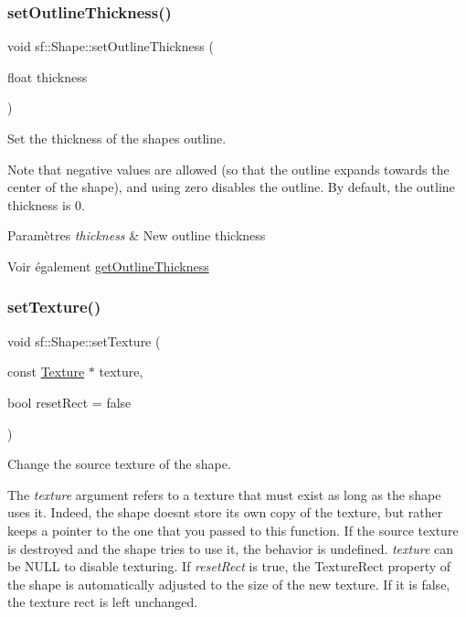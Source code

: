 \subsubsection{\texorpdfstring{set\+Outline\+Thickness()}{setOutlineThickness()}}
{\footnotesize\ttfamily void sf\+::\+Shape\+::set\+Outline\+Thickness (\begin{DoxyParamCaption}\item[{float}]{thickness }\end{DoxyParamCaption})}



Set the thickness of the shape\textquotesingle{}s outline. 

Note that negative values are allowed (so that the outline expands towards the center of the shape), and using zero disables the outline. By default, the outline thickness is 0.


\begin{DoxyParams}{Paramètres}
{\em thickness} & New outline thickness\\
\hline
\end{DoxyParams}
\begin{DoxySeeAlso}{Voir également}
\hyperlink{classsf_1_1Shape_a1d4d5299c573a905e5833fc4dce783a7}{get\+Outline\+Thickness} 
\end{DoxySeeAlso}
\mbox{\label{classsf_1_1Shape_af8fb22bab1956325be5d62282711e3b6}} 
\subsubsection{\texorpdfstring{set\+Texture()}{setTexture()}}
{\footnotesize\ttfamily void sf\+::\+Shape\+::set\+Texture (\begin{DoxyParamCaption}\item[{const \hyperlink{classsf_1_1Texture}{Texture} $\ast$}]{texture,  }\item[{bool}]{reset\+Rect = {\ttfamily false} }\end{DoxyParamCaption})}



Change the source texture of the shape. 

The {\itshape texture} argument refers to a texture that must exist as long as the shape uses it. Indeed, the shape doesn\textquotesingle{}t store its own copy of the texture, but rather keeps a pointer to the one that you passed to this function. If the source texture is destroyed and the shape tries to use it, the behavior is undefined. {\itshape texture} can be N\+U\+LL to disable texturing. If {\itshape reset\+Rect} is true, the Texture\+Rect property of the shape is automatically adjusted to the size of the new texture. If it is false, the texture rect is left unchanged.


